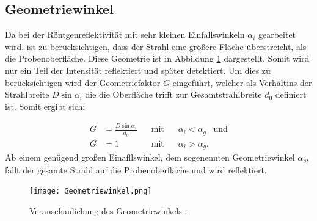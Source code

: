 \subsection{Geometriewinkel}
Da bei der Röntgenreflektivität mit sehr kleinen Einfallswinkeln $\alpha_i$ gearbeitet wird, ist zu berücksichtigen, dass der Strahl eine
größere Fläche überstreicht, als die Probenoberfläche. Diese Geometrie ist in Abbildung \ref{fig:geometrie} dargestellt.
Somit wird nur ein Teil der Intensität reflektiert und später detektiert. Um dies
zu berücksichtigen wird der Geometriefaktor $G$ eingeführt, welcher als Verhältins der Strahlbreite $D\sin{\alpha_i}$ die die Oberfläche trifft zur
Gesamtstrahlbreite $d_0$ definiert ist. Somit ergibt sich:

\begin{align}
    G&=\frac{D\sin\alpha_i}{d_0}\;\;\; &\text{mit}\;\;\; &\alpha_i<\alpha_g\;\;\; \text{und}\\
    G&=1\;\;\; &\text{mit}\;\;\; &\alpha_i>\alpha_g.
\end{align}
Ab einem genügend großen Einafllswinkel, dem sogenennten Geometriewinkel $\alpha_g$, fällt der gesamte Strahl auf die Probenoberfläche
und wird reflektiert.

\begin{figure}
  \centering
  \texttt{[image: Geometriewinkel.png]}
  \caption{Veranschaulichung des Geometriewinkels \cite{skript}.}
  \label{fig:geometrie}
\end{figure}
